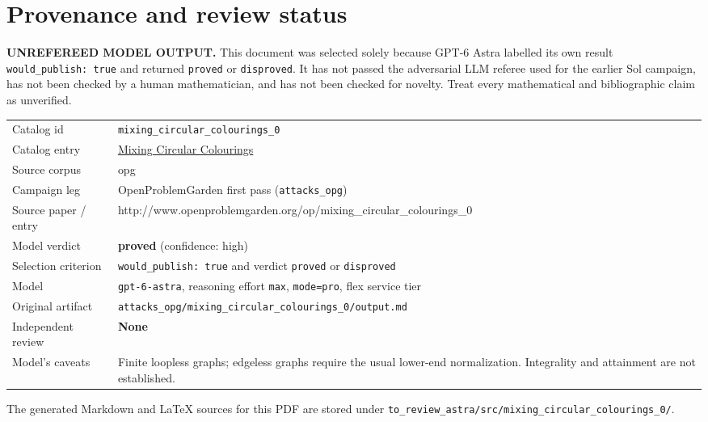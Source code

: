 \documentclass[
  11pt,
  a4paper,
]{article}
\newcounter{none} %
\begin{document}
\appendix

\section{Provenance and review
status}\label{provenance-and-review-status}

\begin{warning}

\textbf{UNREFEREED MODEL OUTPUT.} This document was selected solely
because GPT-6 Astra labelled its own result
\texttt{would\_publish:\ true} and returned \texttt{proved} or
\texttt{disproved}. It has not passed the adversarial LLM referee used
for the earlier Sol campaign, has not been checked by a human
mathematician, and has not been checked for novelty. Treat every
mathematical and bibliographic claim as unverified.

\end{warning}

{\def\LTcaptype{none} %
\begin{longtable}[]{@{}
  >{\raggedright\arraybackslash}p{}
  >{\raggedright\arraybackslash}p{}@{}}
\toprule\noalign{}
\endhead
\bottomrule\noalign{}
\endlastfoot
Catalog id & \texttt{mixing\_circular\_colourings\_0} \\
Catalog entry &
\href{https://graph-theory-ai.github.io/graph-conjectures/op/mixing_circular_colourings_0/}{Mixing
Circular Colourings} \\
Source corpus & opg \\
Campaign leg & OpenProblemGarden first pass (\texttt{attacks\_opg}) \\
Source paper / entry &
http://www.openproblemgarden.org/op/mixing\_circular\_colourings\_0 \\
Model verdict & \textbf{proved} (confidence: high) \\
Selection criterion & \texttt{would\_publish:\ true} and verdict
\texttt{proved} or \texttt{disproved} \\
Model & \texttt{gpt-6-astra}, reasoning effort \texttt{max},
\texttt{mode=pro}, flex service tier \\
Original artifact &
\texttt{attacks\_opg/mixing\_circular\_colourings\_0/output.md} \\
Independent review & \textbf{None} \\
Model's caveats & Finite loopless graphs; edgeless graphs require the
usual lower-end normalization. Integrality and attainment are not
established. \\
\end{longtable}
}

The generated Markdown and LaTeX sources for this PDF are stored under
\texttt{to\_review\_astra/src/mixing\_circular\_colourings\_0/}.
\end{document}
